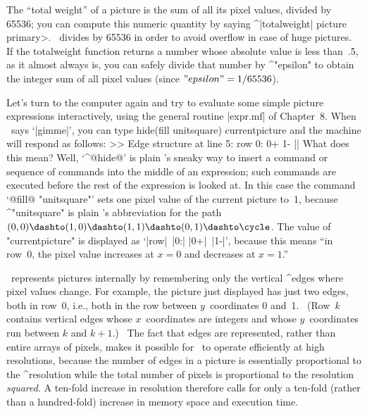 {{{{\danger The ``total weight'' of a picture is the sum of all its pixel
values, divided by 65536; you can compute this numeric quantity by
saying
\begindisplay
^|totalweight| \<picture primary>.
\enddisplay
\MF\ divides by 65536 in order to avoid overflow in case of huge pictures.
If the totalweight function returns a number whose absolute
value is less than~.5, as it almost always is, you can safely divide that number
by ^"epsilon" to obtain the integer sum of all pixel values
(since $"epsilon"=1/65536$).

\danger Let's turn to the computer again and try to evaluate some simple
picture expressions interactively, using the general routine |expr.mf|
of Chapter~8. When \MF\ says `|gimme|', you can type
\begintt
hide(fill unitsquare) currentpicture
\endtt
and the machine will respond as follows:
\begintt
>> Edge structure at line 5:
row 0: 0+ 1- ||
\endtt
What does this mean? Well, `^@hide@' is plain \MF's sneaky way to insert
a command or sequence of commands into the middle of an expression; such
commands are executed before the rest of the expression is looked at. In
this case the command `@fill@ "unitsquare"' sets one pixel value of the
current picture to~1, because ^"unitsquare" is plain \MF's abbreviation
for the path $(0,0)\dashto(1,0)\dashto(1,1)\dashto(0,1)\dashto\cycle$. The
value of "currentpicture" is displayed as `|row|~|0:| |0+|~|1-|', because
this means
``in row~0, the pixel value increases at $x=0$ and decreases at $x=1$.''

\danger \MF\ represents pictures internally by remembering only the vertical
^{edges} where pixel values change. For example, the picture just displayed
has just two edges, both in row~0, i.e., both in the row between $y$~coordinates
0 and~1. \ (Row~$k$ contains vertical edges whose $x$~coordinates are integers
and whose $y$~coordinates run between $k$ and $k+1$.) \ The fact that edges
are represented, rather than entire arrays of pixels, makes it possible for
\MF\ to operate efficiently at high resolutions, because the number of edges
in a picture is essentially proportional to the ^{resolution} while the total
number of pixels is proportional to the resolution {\sl squared}. A ten-fold
increase in resolution therefore calls for only a ten-fold (rather than a
hundred-fold) increase in memory space and execution time.

}}}}
